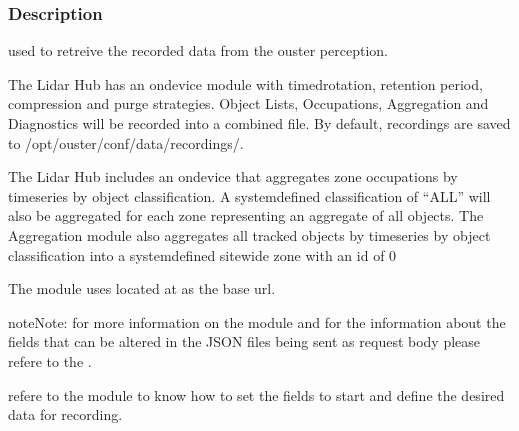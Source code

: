 \documentclass[letterpaper,10pt,english]{sphinxmanual}
\begin{document}
\subsubsection{Description}
\label{\detokenize{gemini_data_recording:description}}
\sphinxAtStartPar
used to retreive the recorded data from the ouster perception.

\sphinxAtStartPar
The Lidar Hub has an on\sphinxhyphen{}device  module with timed\sphinxhyphen{}rotation, retention period, compression and purge strategies. Object Lists, Occupations,
Aggregation and Diagnostics will be recorded into a combined file. By default, recordings are saved to /opt/ouster/conf/data/recordings/.

\sphinxAtStartPar
The Lidar Hub includes an on\sphinxhyphen{}device   that aggregates zone occupations by timeseries by object classification. A system\sphinxhyphen{}defined classification of “ALL” will also be aggregated for each zone representing an aggregate of all objects.
The Aggregation module also aggregates all tracked objects by timeseries by object classification into a system\sphinxhyphen{}defined site\sphinxhyphen{}wide zone with an id of 0

\sphinxAtStartPar
The module uses  located at {\hyperref[\detokenize{gemini_login::doc}]{}} as the base url.

\begin{sphinxadmonition}{note}{Note:}
\sphinxAtStartPar
for more information on the module and for the information about the fields that can be altered in the
JSON files being sent as request body please refere to the .

\sphinxAtStartPar
refere to the module {\hyperref[\detokenize{gemini_lidar_hub_API::doc}]{}} to know how to set the fields to start and define the desired data for recording.
\end{sphinxadmonition}
\label{\detokenize{gemini_data_recording:module-gemini_data_recording}}
\end{document}
